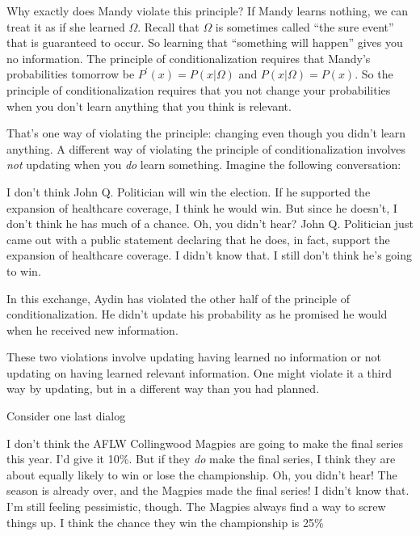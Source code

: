 Why exactly does Mandy violate this principle?  If Mandy learns nothing, we can treat it as if she learned $\Omega$. Recall that $\Omega$ is sometimes called ``the sure event'' that is guaranteed to occur. So learning that ``something will happen'' gives you no information.  The principle of conditionalization requires that Mandy's probabilities tomorrow be $P^\prime(x) = P(x|\Omega)$ and $P(x|\Omega) = P(x)$.  So the principle of conditionalization requires that you not change your probabilities when you don't learn anything that you think is relevant.

That's one way of violating the principle: changing even though you didn't learn anything.  A different way of violating the principle of conditionalization involves {\it not} updating when you {\it do} learn something.  Imagine the following conversation:
\begin{dialogue}
     I don't think John Q. Politician will win the election.  If he supported the expansion of healthcare coverage, I think he would win.  But since he doesn't, I don't think he has much of a chance.
     Oh, you didn't hear?  John Q. Politician just came out with a public statement declaring that he does, in fact, support the expansion of healthcare coverage.
     I didn't know that.  I still don't think he's going to win.
\end{dialogue}

In this exchange, Aydin has violated the other half of the principle of conditionalization. He didn't update his probability as he promised he would when he received new information.

These two violations involve updating having learned no information or not updating on having learned relevant information.  One might violate it a third way by updating, but in a different way than you had planned.

Consider one last dialog

\begin{dialogue}
     I don't think the AFLW Collingwood Magpies are going to make the final series this year.  I'd give it 10\%.  But if they {\it do} make the final series, I think they are about equally likely to win or lose the championship.
     Oh, you didn't hear! The season is already over, and the  Magpies made the final series!
     I didn't know that. I'm still feeling pessimistic, though.  The Magpies always find a way to screw things up. I think the chance they win the championship is 25\%
\end{dialogue}

